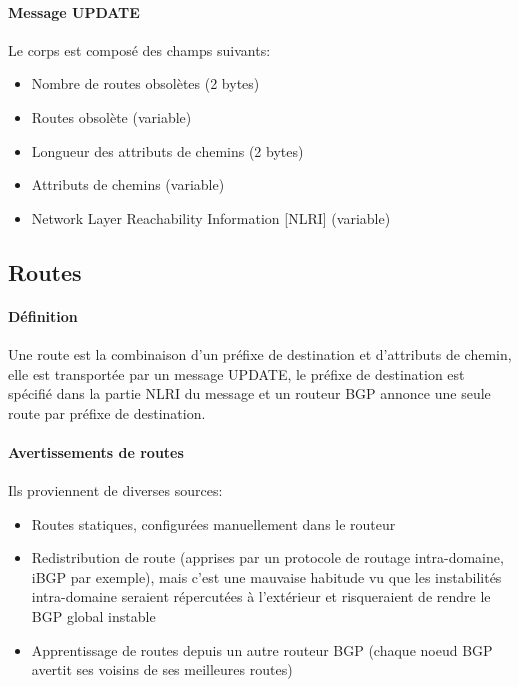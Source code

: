\documentclass{article}
\begin{document}
\begin{sffamily}
\paragraph{Message UPDATE}

Le corps est composé des champs suivants:

\begin{itemize}
\item Nombre de routes obsolètes (2 bytes)
\item Routes obsolète (variable)
\item Longueur des attributs de chemins (2 bytes)
\item Attributs de chemins (variable)
\item Network Layer Reachability Information [NLRI] (variable)
\end{itemize}

\subsection{Routes}

\paragraph{Définition}

Une route est la combinaison d'un préfixe de destination et
d'attributs de chemin, elle est transportée par un message UPDATE, le
préfixe de destination est spécifié dans la partie NLRI du message et
un routeur BGP annonce une seule route par préfixe de destination.

\paragraph{Avertissements de routes}

Ils proviennent de diverses sources:

\begin{itemize}
\item Routes statiques, configurées manuellement dans le routeur
\item Redistribution de route (apprises par un protocole de routage
  intra-domaine, iBGP par exemple), mais c'est une mauvaise habitude
  vu que les instabilités intra-domaine seraient répercutées à
  l'extérieur et risqueraient de rendre le BGP global instable
\item Apprentissage de routes depuis un autre routeur BGP (chaque
  noeud BGP avertit ses voisins de ses meilleures routes)
\end{itemize}


\end{sffamily}
\end{document}
